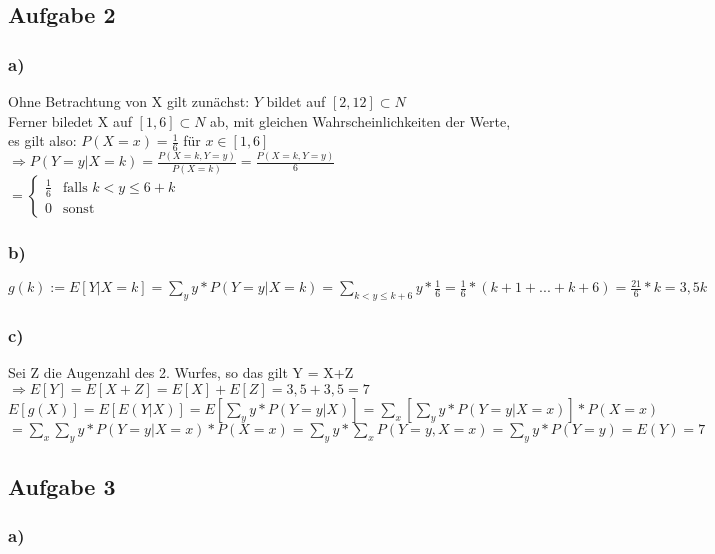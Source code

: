 \documentclass[11pt]{amsart}
\begin{document}
\subsection*{Aufgabe 2}

\subsubsection*{a)}
Ohne Betrachtung von X gilt zunächst: $Y$ bildet auf $[2,12] \subset N$ \\
Ferner biledet X auf $[1,6] \subset N$ ab, mit gleichen Wahrscheinlichkeiten der Werte, es gilt also: $P(X=x) = \frac{1}{6}$ für $x \in [1,6]$ \\
$\Rightarrow P(Y = y | X = k) = \frac{P(X=k , Y = y)}{P(X = k)} = \frac{P(X=k , Y = y)}{6}$ \\
$ = \begin{cases} \frac{1}{6} &\mbox{falls } k < y \leq 6+k \\ 0 &\mbox{sonst} \end{cases}$ \\

\subsubsection*{b)}
$g(k) := E[Y|X=k] = \sum_yy*P(Y=y | X = k) = \sum_{k < y \leq k+6}y*\frac{1}{6} = \frac{1}{6} * (k+1 + ... + k+6) = \frac{21}{6}*k = 3,5k$

\subsubsection*{c)}
Sei Z die Augenzahl des 2. Wurfes, so das gilt Y = X+Z \\
$\Rightarrow E[Y] = E[X+Z] = E[X]+E[Z] = 3,5 + 3,5 = 7$ \\
$E[g(X)] = E[E(Y|X)] = E[\sum_yy*P(Y=y | X )] = \sum_x[\sum_yy*P(Y=y|X=x)]*P(X=x)$ \\
$= \sum_x\sum_yy*P(Y=y|X=x)*P(X=x) = \sum_yy*\sum_xP(Y=y, X=x) = \sum_yy*P(Y=y) = E(Y) = 7$ \\

\subsection*{Aufgabe 3}

\subsubsection*{a)}
\end{document}
